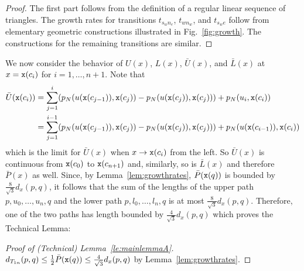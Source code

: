 \begin{proof}
The first part follows from the definition of a regular linear sequence of
triangles. The growth rates for transitions
$t_{s_wn_e}$, $t_{wn_w}$, and $t_{s_we}$ follow from elementary
geometric constructions illustrated in Fig.~\ref{fig:growth}. The constructions
for the remaining transitions are similar.
\end{proof}




We now consider the behavior of $U(x)$, $L(x)$, ${\bar U}(x)$, and ${\bar L}(x)$
at $x = {\tt x}(c_i)$ for $i=1,\dots,n+1$. Note that 
\begin{align*}
\bar{U}({\tt x}(c_i)) & = \sum_{j=1}^{i} (p_N(u({\tt x}(c_{j-1})), {\tt x}(c_{j})) - p_N(u({\tt x}(c_{j})),{\tt x}(c_{j}))) + p_N(u_i, {\tt x}(c_i)) \\
& = \sum_{j=1}^{i-1} (p_N(u({\tt x}(c_{j-1})), {\tt x}(c_{j})) - p_N(u({\tt x}(c_{j})),{\tt x}(c_{j}))) + p_N(u({\tt x}(c_{i-1})), {\tt x}(c_i))
\end{align*}
which is the limit for ${\bar U}(x)$ when $x \rightarrow {\tt x}(c_i)$ from 
the left.
So ${\bar U}(x)$ is continuous from ${\tt x}(c_0)$ to ${\tt x}(c_{n+1})$ and,
similarly, so is ${\bar L}(x)$ and therefore ${\bar P}(x)$ as well.
Since, by Lemma~\ref{lem:growthrates}, ${\bar P}({\tt x}(q))$ is bounded by
$\frac{8}{\sqrt{3}}d_x(p,q)$, it follows that the sum of the lengths of the upper path
$p,u_0, \dots,u_n,q$ and the lower path $p, l_0, \dots, l_n,q$ is at most 
$\frac{8}{\sqrt{3}}d_x(p,q)$. Therefore, one of the two paths has length
bounded by $\frac{4}{\sqrt{3}}d_x(p,q)$ which proves the Technical Lemma:

\begin{proof}[Proof of (Technical) Lemma~\ref{le:mainlemmaA}]
$d_{T_{1n}}(p,q) \leq \frac{1}{2}{\bar P}({\tt x}(q)) \leq \frac{4}{\sqrt{3}}d_x(p,q)$
by Lemma~\ref{lem:growthrates}.%
\end{proof}

